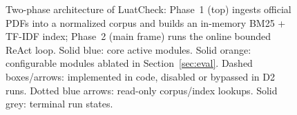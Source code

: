 \begin{figure}[!tbp]\centering
{}
\caption{Two-phase architecture of LuatCheck: Phase~1 (top) ingests official PDFs into a normalized corpus and builds an in-memory BM25 + TF-IDF index; Phase~2 (main frame) runs the online bounded ReAct loop. Solid blue: core active modules. Solid orange: configurable modules ablated in Section~\ref{sec:eval}. Dashed boxes/arrows: implemented in code, disabled or bypassed in D2 runs. Dotted blue arrows: read-only corpus/index lookups. Solid grey: terminal run states.}\label{fig:arch}
\end{figure}
